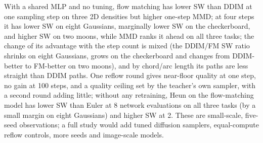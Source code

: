 With a shared MLP and no tuning, flow matching has lower SW than DDIM at one sampling step on three 2D densities but higher one-step MMD; at four steps it has lower SW on eight Gaussians, marginally lower SW on the checkerboard, and higher SW on two moons, while MMD ranks it ahead on all three tasks; the change of its advantage with the step count is mixed (the DDIM/FM SW ratio shrinks on eight Gaussians, grows on the checkerboard and changes from DDIM-better to FM-better on two moons), and by chord/arc length its paths are less straight than DDIM paths. One reflow round gives near-floor quality at one step, no gain at 100 steps, and a quality ceiling set by the teacher's own sampler, with a second round adding little; without any retraining, Heun on the flow-matching model has lower SW than Euler at 8 network evaluations on all three tasks (by a small margin on eight Gaussians) and higher SW at 2. These are small-scale, five-seed observations; a full study would add tuned diffusion samplers, equal-compute reflow controls, more seeds and image-scale models.
